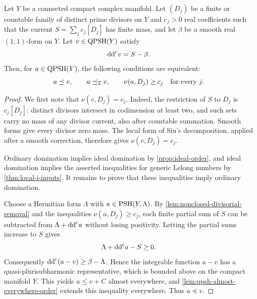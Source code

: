 \begin{lemma}\label{lem:divisorial-potential-domination}
Let $Y$ be a connected compact complex manifold. Let $(D_j)$ be a finite or countable family of distinct prime divisors on $Y$ and $c_j>0$ real coefficients such that the current $S=\sum_jc_j[D_j]$ has finite mass, and let $\beta$ be a smooth real $(1,1)$-form on $Y$. Let $v\in\mathrm{QPSH}(Y)$ satisfy
\[
 \mathrm{dd}^{\mathrm{c}} v=S-\beta.
\]
Then, for $a\in\mathrm{QPSH}(Y)$, the following conditions are equivalent:
\[
 a\preceq v,\qquad a\preceq_{\mathcal I}v,\qquad
 \nu(a,D_j)\geq c_j\quad\hbox{for every }j.
\]
\end{lemma}
\begin{proof}
We first note that $\nu(v,D_j)=c_j$. Indeed, the restriction of $S$ to $D_j$ is $c_j[D_j]$: distinct divisors intersect in codimension at least two, and such sets carry no mass of any divisor current, also after countable summation. Smooth forms give every divisor zero mass. The local form of Siu's decomposition, applied after a smooth correction, therefore gives $\nu(v,D_j)=c_j$.

Ordinary domination implies ideal domination by \cref{prop:ideal-order}, and ideal domination implies the asserted inequalities for generic Lelong numbers by \cref{thm:local-i-inputs}. It remains to prove that these inequalities imply ordinary domination.

Choose a Hermitian form $\Lambda$ with $a\in\mathrm{PSH}(Y,\Lambda)$. By \cref{lem:nonclosed-divisorial-removal} and the inequalities $\nu(a,D_j)\geq c_j$, each finite partial sum of $S$ can be subtracted from $\Lambda+\mathrm{dd}^{\mathrm{c}} a$ without losing positivity. Letting the partial sums increase to $S$ gives
\[
 \Lambda+\mathrm{dd}^{\mathrm{c}} a-S\geq0.
\]
Consequently $\mathrm{dd}^{\mathrm{c}}(a-v)\geq\beta-\Lambda$. Hence the integrable function $a-v$ has a quasi-plurisubharmonic representative, which is bounded above on the compact manifold $Y$. This yields $a\leq v+C$ almost everywhere, and \cref{lem:qpsh-almost-everywhere-order} extends this inequality everywhere. Thus $a\preceq v$.
\end{proof}


